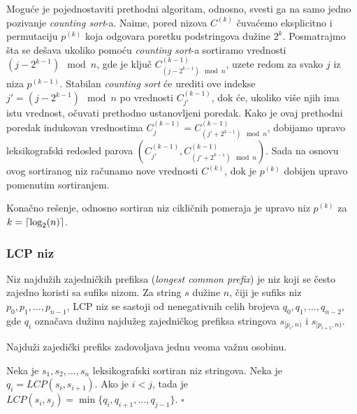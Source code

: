 Mogu\' ce je pojednostaviti prethodni algoritam, odnosno, svesti ga na samo jedno pozivanje \textit{counting sort}-a. Naime, pored nizova $C^{(k)}$ \v cuva\' cemo eksplicitno i permutaciju $p^{(k)}$ koja odgovara poretku podstringova du\v zine $2^k$. Posmatrajmo \v sta se de\v sava ukoliko pomo\' cu \textit{counting sort}-a sortiramo vrednosti $(j - 2^{k-1}) \mod n$, gde je klju\v c $C^{(k-1)}_{(j - 2^{k-1}) \mod n}$, uzete redom za svako $j$ iz niza $p^{(k-1)}$. Stabilan \textit{counting sort} \' ce urediti ove indekse $j' = (j - 2^{k-1}) \mod n$ po vrednosti $C^{(k-1)}_{j'}$, dok \' ce, ukoliko vi\v se njih ima istu vrednost, o\v cuvati prethodno ustanovljeni poredak. Kako je ovaj prethodni poredak indukovan vrednostima $C^{(k-1)}_j = C^{(k-1)}_{(j' + 2^{k-1}) \mod n}$, dobijamo upravo leksikografski redosled parova $(C^{(k-1)}_{j'}, C^{(k-1)}_{(j' + 2^{k-1}) \mod n})$. Sada na osnovu ovog sortiranog niz ra\v cunamo nove vrednosti $C^{(k)}$, dok je $p^{(k)}$ dobijen upravo pomenutim sortiranjem.

Kona\v cno re\v senje, odnosno sortiran niz cikli\v cnih pomeraja je upravo niz $p^{(k)}$ za $k = \left \lceil \log_2(n) \right \rceil$.

\noindent
\begin{minipage}[l]{\textwidth}

\end{minipage}

\subsubsection{LCP niz}

Niz najdu\v zih zajedni\v ckih prefiksa (\textit{longest common prefix}) je niz koji se \v cesto zajedno koristi sa sufiks nizom. Za string $s$ du\v zine $n$, \v ciji je sufiks niz $p_0, p_1, \ldots, p_{n-1}$, LCP niz se sastoji od nenegativnih celih brojeva $q_0, q_1, \ldots, q_{n-2}$, gde $q_i$ ozna\v cava du\v zinu najdu\v zeg zajedni\v ckog prefiksa stringova $s_{[p_i, n)}$ i $s_{[p_{i+1}, n)}$.

Najdu\v zi zajedi\v cki prefiks zadovoljava jednu veoma va\v znu osobinu.

\begin{thm}
\label{lcposobina}
Neka je $s_1, s_2, \ldots, s_n$ leksikografski sortiran niz stringova. Neka je $q_i = LCP(s_i, s_{i+1})$. Ako je $i<j$, tada je $LCP(s_i, s_j) = \min\{q_i, q_{i+1}, \ldots, q_{j-1}\}$. \hfill $\square$
\end{thm}


